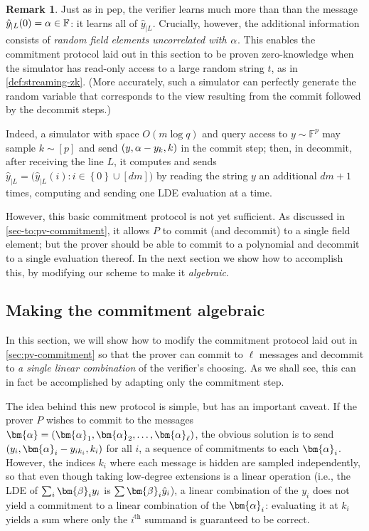 \documentclass[10pt,a4paper]{article}
\theoremstyle{definition}
\newtheorem{remark}[theorem]{Remark}
\newcommand{\field}{\mathbb{F}}
\renewcommand{\set}[1]{\left\{#1\right\}}
\newcommand{\pepprotocol}{\textsf{pep}\xspace}
\newcommand{\pcommitlength}{p}
\newcommand{\pcommitstring}{y}
\newcommand{\dimension}{m}
\newcommand{\degree}{d}
\newcommand{\fieldsize}{q}
\newcommand{\evaluationpoint}{\bm{\fe2}}
\renewcommand{\line}{L}
\def\fe#1{
    \ifnum#1=1
        \alpha
    \else
    \ifnum#1=2
        \beta
    \else
    \ifnum#1=3
        \gamma
    \fi\fi\fi
}
\begin{document}
\begin{remark}
    Just as in \pepprotocol, the verifier learns much more than than the message $\hat \pcommitstring_{|\line}(0) = \fe1 \in \field$: it learns all of $\hat \pcommitstring_{|\line}$. Crucially, however, the additional information consists of \emph{random field elements uncorrelated with $\fe1$}. This enables the commitment protocol laid out in this section to be proven zero-knowledge when the simulator has read-only access to a large random string $t$, as in \cref{def:streaming-zk}. (More accurately, such a simulator can perfectly generate the random variable that corresponds to the view resulting from the \textsf{commit} followed by the \textsf{decommit} steps.)
    
    Indeed, a simulator with space $O(\dimension \log \fieldsize)$ and query access to $\pcommitstring \sim \field^\pcommitlength$ may sample $k \sim [\pcommitlength]$ and send $(\pcommitstring, \fe1 - \pcommitstring_k, k)$ in the \textsf{commit} step; then, in \textsf{decommit}, after receiving the line $\line$, it computes and sends $\hat y_{|\line} = \big(\hat \pcommitstring_{|\line}(i) : i \in \set{0} \cup [\degree\dimension]\big)$ by reading the string $\pcommitstring$ an additional $\degree \dimension + 1$ times, computing and sending one LDE evaluation at a time.
\end{remark}

However, this basic commitment protocol is not yet sufficient. As discussed in \cref{sec-to:pv-commitment}, it allows $P$ to commit (and decommit) to a single field element; but the prover should be able to commit to a polynomial and decommit to a single evaluation thereof. In the next section we show how to accomplish this, by modifying our scheme to make it \emph{algebraic}.

\subsection{Making the commitment algebraic}
\label{sec:pv-algebraic-commitment}

In this section, we will show how to modify the commitment protocol laid out in \cref{sec:pv-commitment} so that the prover can commit to $\ell$ messages and decommit to \emph{a single linear combination} of the verifier's choosing. As we shall see, this can in fact be accomplished by adapting only the commitment step.

The idea behind this new protocol is simple, but has an important caveat. If the prover $P$ wishes to commit to the messages $\bm{\fe1} = (\bm{\fe1}_1, \bm{\fe1}_2, \ldots, \bm{\fe1}_\ell)$, the obvious solution is to send $(\pcommitstring_i, \bm{\fe1}_i - \pcommitstring_{ik_i}, k_i)$ for all $i$, a sequence of commitments to each $\bm{\fe1}_i$. However, the indices $k_i$ where each message is hidden are sampled independently, so that even though taking low-degree extensions is a linear operation (i.e., the LDE of $\sum_i \evaluationpoint_i \pcommitstring_i$ is $\sum \evaluationpoint_i \hat \pcommitstring_i$), a linear combination of the $\pcommitstring_i$ does not yield a commitment to a linear combination of the $\bm{\fe1}_i$: evaluating it at $k_i$ yields a sum where only the $i^\text{th}$ summand is guaranteed to be correct.
\end{document}

